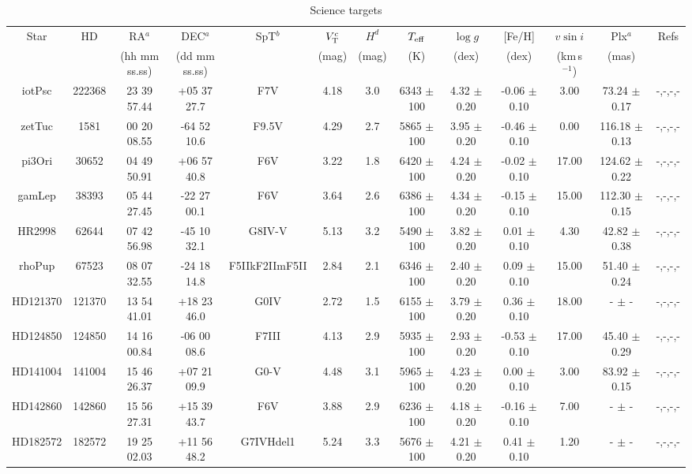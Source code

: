 \begin{landscape}
\begin{table}
\centering
\caption{Science targets}
\label{tab:science_targets}
\begin{tabular}{ccccccccccccc}
\hline
Star & HD & RA$^a$ & DEC$^a$ & SpT$^b$ & $V_{\rm T}^c$ & $H^d$ & $T_{\rm eff}$ & $\log g$ & [Fe/H] & $v \sin i$ & Plx$^a$ & Refs \\
 &  & (hh mm ss.ss) & (dd mm ss.ss) &  & (mag) & (mag) & (K) & (dex) & (dex) & (km$\,$s$^{-1}$) & (mas) &  \\
\hline
iotPsc & 222368 & 23 39 57.44 & +05 37 27.7 & F7V & 4.18 & 3.0 & 6343 $\pm$ 100 & 4.32 $\pm$ 0.20 &-0.06 $\pm$ 0.10 &3.00 & 73.24 $\pm$ 0.17 & -,-,-,-\\
zetTuc & 1581 & 00 20 08.55 & -64 52 10.6 & F9.5V & 4.29 & 2.7 & 5865 $\pm$ 100 & 3.95 $\pm$ 0.20 &-0.46 $\pm$ 0.10 &0.00 & 116.18 $\pm$ 0.13 & -,-,-,-\\
pi3Ori & 30652 & 04 49 50.91 & +06 57 40.8 & F6V & 3.22 & 1.8 & 6420 $\pm$ 100 & 4.24 $\pm$ 0.20 &-0.02 $\pm$ 0.10 &17.00 & 124.62 $\pm$ 0.22 & -,-,-,-\\
gamLep & 38393 & 05 44 27.45 & -22 27 00.1 & F6V & 3.64 & 2.6 & 6386 $\pm$ 100 & 4.34 $\pm$ 0.20 &-0.15 $\pm$ 0.10 &15.00 & 112.30 $\pm$ 0.15 & -,-,-,-\\
HR2998 & 62644 & 07 42 56.98 & -45 10 32.1 & G8IV-V & 5.13 & 3.2 & 5490 $\pm$ 100 & 3.82 $\pm$ 0.20 &0.01 $\pm$ 0.10 &4.30 & 42.82 $\pm$ 0.38 & -,-,-,-\\
rhoPup & 67523 & 08 07 32.55 & -24 18 14.8 & F5IIkF2IImF5II & 2.84 & 2.1 & 6346 $\pm$ 100 & 2.40 $\pm$ 0.20 &0.09 $\pm$ 0.10 &15.00 & 51.40 $\pm$ 0.24 & -,-,-,-\\
HD121370 & 121370 & 13 54 41.01 & +18 23 46.0 & G0IV & 2.72 & 1.5 & 6155 $\pm$ 100 & 3.79 $\pm$ 0.20 &0.36 $\pm$ 0.10 &18.00 & - $\pm$ - & -,-,-,-\\
HD124850 & 124850 & 14 16 00.84 & -06 00 08.6 & F7III & 4.13 & 2.9 & 5935 $\pm$ 100 & 2.93 $\pm$ 0.20 &-0.53 $\pm$ 0.10 &17.00 & 45.40 $\pm$ 0.29 & -,-,-,-\\
HD141004 & 141004 & 15 46 26.37 & +07 21 09.9 & G0-V & 4.48 & 3.1 & 5965 $\pm$ 100 & 4.23 $\pm$ 0.20 &0.00 $\pm$ 0.10 &3.00 & 83.92 $\pm$ 0.15 & -,-,-,-\\
HD142860 & 142860 & 15 56 27.31 & +15 39 43.7 & F6V & 3.88 & 2.9 & 6236 $\pm$ 100 & 4.18 $\pm$ 0.20 &-0.16 $\pm$ 0.10 &7.00 & - $\pm$ - & -,-,-,-\\
HD182572 & 182572 & 19 25 02.03 & +11 56 48.2 & G7IVHdel1 & 5.24 & 3.3 & 5676 $\pm$ 100 & 4.21 $\pm$ 0.20 &0.41 $\pm$ 0.10 &1.20 & - $\pm$ - & -,-,-,-\\

\end{tabular}
\end{table}
\end{landscape}
